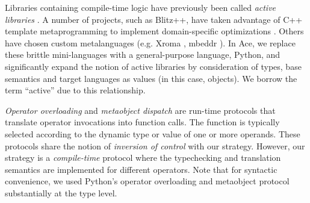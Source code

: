 \documentclass[10pt,preprint]{sigplanconf}
\begin{document}
{%

Libraries containing compile-time logic have previously been called {\it active libraries} \cite{activelibraries}. A number of  projects, such as Blitz++, have taken advantage of C++ template metaprogramming to implement domain-specific optimizations \cite{veldhuizen2000blitz++}. Others have chosen custom metalanguages (e.g. Xroma \cite{activelibraries}, mbeddr \cite{mbeddr}). In Ace, we replace these brittle mini-languages with a general-purpose language, Python, and significantly expand the notion of active libraries by consideration of types, base semantics and target languages as values (in this case, objects). We borrow the term ``active'' due to this relationship.


{\it Operator overloading} \cite{vanWijngaarden:Mailloux:Peck:Koster:Sintzoff:Lindsey:Meertens:Fisker:acta:1975} and {\it metaobject dispatch} \cite{Kiczales91} are run-time protocols that translate operator invocations into function calls. The function is typically selected according to the dynamic type or value of one or more operands. These protocols share the notion of {\it inversion of control} with our strategy. However, our strategy is a {\it compile-time} protocol where the typechecking and translation semantics are implemented for different operators. Note that for syntactic convenience, we used Python's operator overloading and metaobject protocol substantially at the type level.%

}
\end{document}
